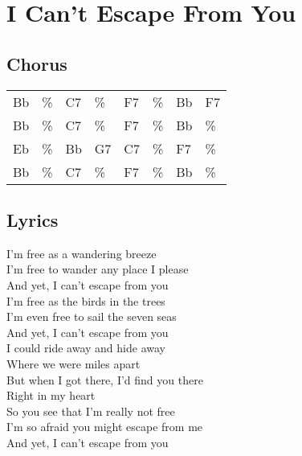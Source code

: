 \section{I Can't Escape From You}


\subsection*{Chorus}


\begin{tabular}{l l l l l l l l}
Bb & \% & C7 & \% & F7 & \% & Bb & F7 \\ 
Bb & \% & C7 & \% & F7 & \% & Bb & \% \\ 
Eb & \% & Bb & G7 & C7 & \% & F7 & \% \\ 
Bb & \% & C7 & \% & F7 & \% & Bb & \% \\ 
\end{tabular}


\subsection*{Lyrics}


I'm free as a wandering breeze \\ 
I'm free to wander any place I please \\ 
And yet, I can't escape from you \\ 

I'm free as the birds in the trees \\ 
I'm even free to sail the seven seas \\ 
And yet, I can't escape from you \\ 

I could ride away and hide away \\ 
Where we were miles apart \\ 
But when I got there, I'd find you there \\ 
Right in my heart \\ 

So you see that I'm really not free \\ 
I'm so afraid you might escape from me \\ 
And yet, I can't escape from you \\ 
